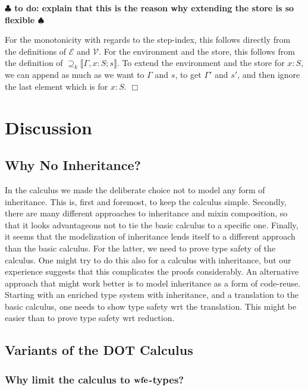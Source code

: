 \documentclass[9pt]{sigplanconf}
\newenvironment{proofsketch}{{\em Proof Sketch:}}{$\Box$}
\newcommand{\remark}[1]{{\bf $\clubsuit$ #1 $\spadesuit$}}
\newcommand{\todo}[1]{\remark{to do: #1}}
\newcommand{\nswfe}{\mbox{\textbf{wfe}}}
\newcommand{\envplus}[1]{, #1}
\newcommand{\rels}[3]{\mathcal{\supseteq}_{#1}\llbracket#2;#3\rrbracket}
\begin{document}
\todo{explain that this is the reason why extending the store is so
  flexible}

\begin{proofsketch}
For the monotonicity with regards to the step-index, this follows
directly from the definitions of $\mathcal{E}$ and $\mathcal{V}$. For the
environment and the store, this follows from the definition of $\rels
k {\Gamma \envplus{x : S}} s$. To extend the environment and the store
for $x : S$, we can append as much as we want to $\Gamma$ and $s$, to
get $\Gamma'$ and $s'$, and then ignore the last element which is for
$x : S$.
\end{proofsketch}

\section{Discussion}\label{discussion}

\subsection{Why No Inheritance?}\label{why-no-inheritance}

In the calculus we made the deliberate choice not to model any form of
inheritance. This is, first and foremost, to keep the calculus simple.
Secondly, there are many different approaches to inheritance and
mixin composition, so that it looks advantageous not to tie the basic
calculus to a specific one. Finally, it seems that the modelization of
inheritance lends itself to a different approach than the basic
calculus. For the latter, we need to prove type safety of the calculus.
One might try to do this also for a calculus with inheritance, but our
experience suggests that this complicates the proofs considerably.  An
alternative approach that might work better is to model inheritance
as a form of code-reuse. Starting with an enriched type system with
inheritance, and a translation to the basic calculus, one needs to
show type safety wrt the translation. This might be easier than
to prove type safety wrt reduction.

\subsection{Variants of the DOT Calculus}\label{dot-variants}

\subsubsection{Why limit the calculus to $\nswfe$-types?}
\end{document}
